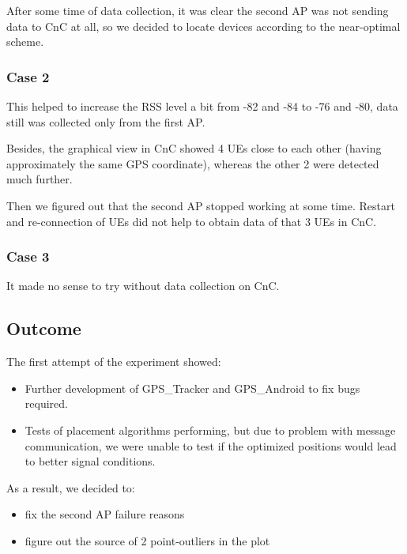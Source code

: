 After some time of data collection, it was clear the second AP was not sending data to CnC at all, so we decided to locate devices according to the near-optimal scheme.

\subsubsection{Case 2}

This helped to increase the RSS level a bit from -82 and -84 to -76 and
-80, data still was collected only from the first AP.

Besides, the graphical view in CnC showed 4 UEs close to each other (having approximately the same GPS coordinate), whereas the other 2 were detected much further.

Then we figured out that the second AP stopped working at some time. Restart and re-connection of UEs did not help to obtain data of that 3 UEs in CnC.

\subsubsection{Case 3}

It made no sense to try without data collection on CnC.

\subsection{Outcome}

The first attempt of the experiment showed:

\begin{itemize}
\tightlist
\item
  Further development of GPS\_Tracker and GPS\_Android to fix bugs required.
\item
  Tests of placement algorithms performing, but due to problem with message communication, we were unable to test if the optimized positions would lead to better signal conditions.
\end{itemize}

As a result, we decided to:

\begin{itemize}
\tightlist
\item
  fix the second AP failure reasons
\item
  figure out the source of 2 point-outliers in the plot
\end{itemize}

